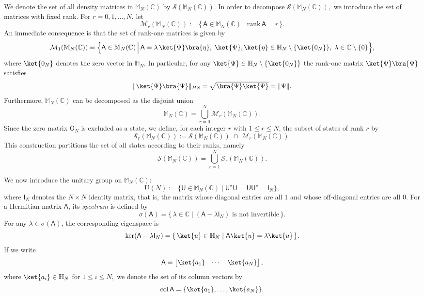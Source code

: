 \documentclass[a4paper,11pt]{article}
\newcommand{\rI}{\mathsf{I}}
\newcommand{\rU}{\mathsf{U}}
\newcommand{\rA}{\mathsf{A}}
\newcommand{\rO}{\mathsf{O}}
\begin{document}
We denote the set of all density matrices in $\mathbb{M}_N(\mathbb{C})$  by
\(
\mathcal{S}(\mathbb{M}_N(\mathbb{C})).
\)
In order to decompose $\mathcal{S}(\mathbb{M}_N(\mathbb{C})),$ we introduce the set of matrices with fixed rank. For \(r = 0,1,\dots, N\), let
\[
\mathcal{M}_r(\mathbb{M}_N(\mathbb{C})) := \{\,\rA \in \mathbb{M}_N(\mathbb{C}) \mid \mathrm{rank}\,\rA = r\,\}.
\]
An immediate consequence is that the set of rank-one matrices is given by
\[
\mathcal{M}_1(\mathbb{M}_N(\mathbb{C})) = \Bigl\{ \rA \in \mathbb{M}_N(\mathbb{C}) \,\Big|\, \rA = \lambda\,\ket{\Psi}\bra{\eta},\; \ket{\Psi},\ket{\eta}\in \mathbb{H}_N\setminus\{\ket{0_N}\},\; \lambda \in \mathbb{C}\setminus\{0\} \Bigr\},
\]
where \(\ket{0_N}\) denotes the zero vector in \(\mathbb{H}_N\),
In particular, for any \(\ket{\Psi} \in \mathbb{H}_N \setminus \{\ket{0_N}\}\) the rank-one matrix \(\ket{\Psi}\bra{\Psi}\) satisfies
\[
\|\ket{\Psi}\bra{\Psi}\|_{HS} = \sqrt{\bra{\Psi}\ket{\Psi}} = \|\Psi\|.
\]
Furthermore, \(\mathbb{M}_N(\mathbb{C})\) can be decomposed as the disjoint union
\[
\mathbb{M}_N(\mathbb{C}) = \bigcup_{r=0}^{N} \mathcal{M}_r(\mathbb{M}_N(\mathbb{C})).
\]
Since the zero matrix \(\rO_N\) is excluded as a state, we define, for each integer \(r\) with \(1 \le r \le N\), the subset of states of rank \(r\) by
\[
\mathcal{S}_r(\mathbb{M}_N(\mathbb{C})) 
:= \mathcal{S}(\mathbb{M}_N(\mathbb{C})) \;\cap\; \mathcal{M}_r(\mathbb{M}_N(\mathbb{C})).
\]
This construction partitions the set of all states according to their ranks, namely
\[
\mathcal{S}(\mathbb{M}_N(\mathbb{C})) 
= \bigcup_{r=1}^{N} \mathcal{S}_r(\mathbb{M}_N(\mathbb{C})).
\]

We now introduce the unitary group on \(\mathbb{M}_N(\mathbb{C})\):
\[
\mathrm{U}(N) := \{\rU \in \mathbb{M}_N(\mathbb{C}) \mid \rU^{\star}\rU = \rU\rU^{\star} = \rI_N\},
\]
where \(\rI_N\) denotes the \(N \times N\) identity matrix, that is, the matrix whose diagonal entries are all \(1\) and whose off-diagonal entries are all \(0\).
For a Hermitian matrix \(\rA\), its \emph{spectrum} is defined by
\[
\sigma(\rA) = \{\,\lambda \in \mathbb{C} \mid (\rA - \lambda \rI_N) \text{ is not invertible} \,\}.
\]
For any \(\lambda \in \sigma(\rA)\), the corresponding eigenspace is
\[
\ker(\rA-\lambda \rI_N) = \{\,\ket{u} \in \mathbb{H}_N \mid \rA\ket{u} = \lambda\ket{u}\,\}.
\]
If we write
\[
\rA = \begin{bmatrix} \ket{a_1} & \cdots & \ket{a_N} \end{bmatrix},
\]
where $\ket{a_i} \in \mathbb{H}_N$ for $1\le i \le N,$ we denote the set of its column vectors by
\[
\mathrm{col}\,\rA = \{\ket{a_1},\dots,\ket{a_N}\}.
\]
\end{document}
